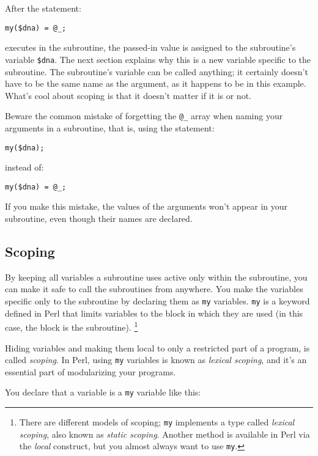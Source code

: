 After the statement:

\begin{lstlisting}
my($dna) = @_;
\end{lstlisting}

executes in the subroutine, the passed-in value is assigned to the subroutine's variable \verb|$dna|. The next section explains why this is a new variable specific to the subroutine. The subroutine's variable can be called anything; it certainly doesn't have to be the same name as the argument, as it happens to be in this example. What's cool about scoping is that it doesn't matter if it is or not. 

\begin{adjustwidth}{2cm}{2cm}
  Beware the common mistake of forgetting the \verb|@_| array when naming your arguments in a subroutine, that is, using the statement:
  \begin{lstlisting}
my($dna);
  \end{lstlisting}
  instead of:
  \begin{lstlisting}
my($dna) = @_;
  \end{lstlisting}
  If you make this mistake, the values of the arguments won't appear in your subroutine, even though their names are declared. 
\end{adjustwidth}

\subsection{Scoping}
By keeping all variables a subroutine uses active only within the subroutine, you can make it safe to call the subroutines from anywhere. You make the variables specific only to the subroutine by declaring them as \verb|my| variables. \verb|my| is a keyword defined in Perl that limits variables to the block in which they are used (in this case, the block is the subroutine). \footnote{There are different models of scoping; \verb|my| implements a type called \textit{lexical scoping}, also known as \textit{static scoping}. Another method is available in Perl via the \textit{local} construct, but you almost always want to use \verb|my|.} 

Hiding variables and making them local to only a restricted part of a program, is called \textit{scoping}. In Perl, using \verb|my| variables is known as \textit{lexical scoping}, and it's an essential part of modularizing your programs.

You declare that a variable is a \verb|my| variable like this:

